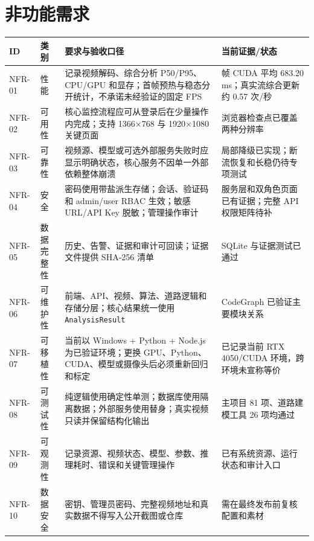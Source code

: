 \section{非功能需求}\label{requirements-ux975eux529fux80fdux9700ux6c42}

\begin{longtable}[]{@{}
  >{\raggedright\arraybackslash}p{}
  >{\raggedright\arraybackslash}p{}
  >{\raggedright\arraybackslash}p{}
  >{\raggedright\arraybackslash}p{}@{}}
\toprule\noalign{}
\begin{minipage}[b]{\linewidth}\raggedright
ID
\end{minipage} & \begin{minipage}[b]{\linewidth}\raggedright
类别
\end{minipage} & \begin{minipage}[b]{\linewidth}\raggedright
要求与验收口径
\end{minipage} & \begin{minipage}[b]{\linewidth}\raggedright
当前证据/状态
\end{minipage} \\
\midrule\noalign{}
\endhead
\bottomrule\noalign{}
\endlastfoot
NFR-01 & 性能 & 记录视频解码、综合分析 P50/P95、CPU/GPU 和显存；首帧预热与稳态分开统计，不承诺未经验证的固定 FPS & 65 帧 CUDA 平均 683.20 ms；真实流综合更新约 0.57 次/秒 \\
NFR-02 & 可用性 & 核心监控流程应可从登录后在少量操作内完成；支持 1366×768 与 1920×1080 关键页面 & 浏览器检查点已覆盖两种分辨率 \\
NFR-03 & 可靠性 & 视频源、模型或可选外部服务失败时应显示明确状态，核心服务不因单一外部依赖整体崩溃 & 局部降级已实现；断流恢复和长稳仍待专项测试 \\
NFR-04 & 安全 & 密码使用带盐派生存储；会话、验证码和 admin/user RBAC 生效；敏感 URL/API Key 脱敏；管理操作审计 & 服务层和双角色页面已有证据；完整 API 权限矩阵待补 \\
NFR-05 & 数据完整性 & 历史、告警、证据和审计可回读；证据文件提供 SHA-256 清单 & SQLite 与证据测试已通过 \\
NFR-06 & 可维护性 & 前端、API、视频、算法、道路逻辑和存储分层；核心结果统一使用 \texttt{Analysis\allowbreak{}Result} & CodeGraph 已验证主要模块关系 \\
NFR-07 & 可移植性 & 当前以 Windows + Python + Node.js 为已验证环境；更换 GPU、Python、CUDA、模型或摄像头后必须重新回归和标定 & 已记录当前 RTX 4050/CUDA 环境，跨环境未宣称等价 \\
NFR-08 & 可测试性 & 纯逻辑使用确定性单测；数据库使用隔离数据；外部服务使用替身；真实视频只读并保留结构化输出 & 主项目 81 项、道路建模工具 26 项均通过 \\
NFR-09 & 可观测性 & 记录资源、视频状态、模型、参数、推理耗时、错误和关键管理操作 & 已有系统资源、运行状态和审计入口 \\
NFR-10 & 数据安全 & 密钥、管理员密码、完整视频地址和真实数据不得写入公开截图或仓库 & 需在最终发布前复核配置和素材 \\
\end{longtable}

